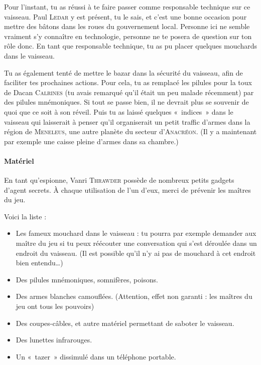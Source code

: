 \documentclass{article}
\begin{document}
{Pour l’instant, tu as réussi à te faire passer comme responsable technique sur ce vaisseau.
Paul \textsc{Ledar} y est présent, tu le sais, et c’est une bonne occasion pour mettre des bâtons dans les roues du gouvernement local.
Personne ici ne semble vraiment s’y connaître en technologie, personne ne te posera de question sur ton rôle donc.
En tant que responsable technique, tu as pu placer quelques mouchards dans le vaisseau.

Tu as également tenté de mettre le bazar dans la sécurité du vaisseau, afin de faciliter tes prochaines actions.
Pour cela, tu as remplacé les pilules pour la toux de Dacan \textsc{Calrines} (tu avais remarqué qu’il était un peu malade récemment) par des pilules mnémoniques.
Si tout se passe bien, il ne devrait plus se souvenir de quoi que ce soit à son réveil.
Puis tu as laissé quelques «~indices~» dans le vaisseau qui laisserait à penser qu’il organiserait un petit traffic d’armes dans la région de \textsc{Meneleus}, une autre planète du secteur d’\textsc{Anacréon}.
(Il y a maintenant par exemple une caisse pleine d’armes dans sa chambre.)

\paragraph{Matériel}
{
En tant qu’espionne, Vanri \textsc{Thrawder} possède de nombreux petits gadgets d’agent secrets.
À chaque utilisation de l’un d’eux, merci de prévenir les maîtres du jeu.

Voici la liste :
\begin{itemize}
	\item Les fameux mouchard dans le vaisseau : tu pourra par exemple demander aux maître du jeu si tu peux réécouter une conversation qui s’est déroulée dans un endroit du vaisseau. (Il est possible qu’il n’y ai pas de mouchard à cet endroit bien entendu…)
	\item Des pilules mnémoniques, somnifères, poisons.
	\item Des armes blanches camouflées. (Attention, effet non garanti : les maîtres du jeu ont tous les pouvoirs)
	\item Des coupes-câbles, et autre matériel permettant de saboter le vaisseau.
	\item Des lunettes infrarouges.
	\item Un «~tazer~» dissimulé dans un téléphone portable.
\end{itemize}
}
}
\end{document}
